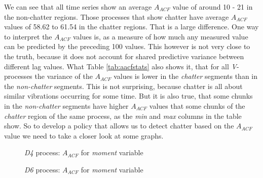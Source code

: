 \documentclass[12 pt]{scrartcl}
\begin{document}
We can see that all time series show an average $A_{ACF}$ value of around 10 - 21 in the non-chatter regions. Those processes that show chatter have average $A_{ACF}$ values of 58.62 to 61.54 in the chatter regions. That is a large difference. One way to interpret the $A_{ACF}$ values is, as a measure of how much any measured value can be predicted by the preceding 100 values. This however is not very close to the truth, because it does not account for shared predictive variance between different lag values. What Table \ref{tab:aacfstats} also shows it, that for all \emph{V}-processes the variance of the $A_{ACF}$ values is lower in the \emph{chatter} segments than in the \emph{non-chatter} segments. This is not surprising, because chatter is all about similar vibrations occurring for some time.
But it is also true, that some chunks in the \emph{non-chatter} segments have higher $A_{ACF}$ values that some chunks of the \emph{chatter} region of the same process, as the \emph{min} and \emph{max} columns in the table show. So to develop a policy that allows us to detect chatter based on the $A_{ACF}$ value we need to take a closer look at some graphs.

\begin{figure}[p]
  \caption{\emph{D4} process: $A_{ACF}$ for \emph{moment} variable}
  \label{fig:d4-moment-aacf}
\end{figure}


\begin{figure}[p]
  \caption{\emph{D6} process: $A_{ACF}$ for \emph{moment} variable}
  \label{fig:d6-moment-aacf}
\end{figure}
\end{document}

